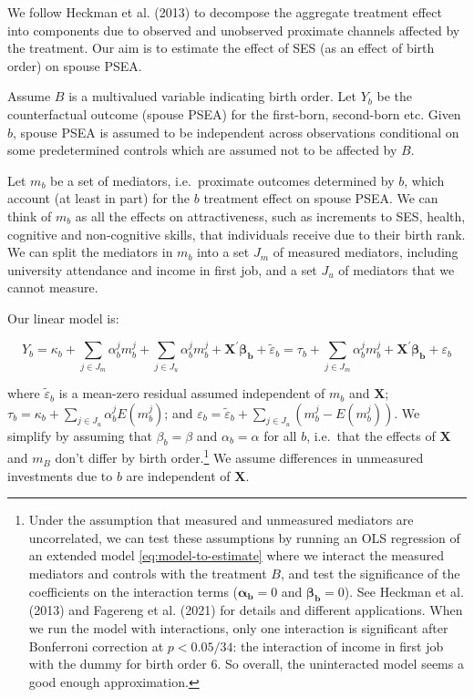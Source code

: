 \documentclass[
  12pt,
]{article}
\theoremstyle{definition}
\theoremstyle{definition}
\theoremstyle{definition}
\theoremstyle{definition}
\theoremstyle{remark}
\begin{document}
We follow Heckman et al. (2013) to decompose the aggregate treatment
effect into components due to observed and unobserved proximate channels
affected by the treatment. Our aim is to estimate the effect of SES (as
an effect of birth order) on spouse PSEA.

Assume \(B\) is a multivalued variable indicating birth order. Let \(Y_b\)
be the counterfactual outcome (spouse PSEA) for the first-born,
second-born etc. Given \(b\), spouse PSEA is assumed to be independent
across observations conditional on some predetermined controls which are
assumed not to be affected by \(B\).

Let \(m_{b}\) be a set of mediators, i.e.~proximate outcomes determined by
\(b\), which account (at least in part) for the \(b\) treatment effect on
spouse PSEA. We can think of \(m_{b}\) as all the effects on
attractiveness, such as increments to SES, health, cognitive and
non-cognitive skills, that individuals receive due to their birth rank.
We can split the mediators in \(m_b\) into a set \(J_m\) of measured
mediators, including university attendance and income in first job, and
a set \(J_u\) of mediators that we cannot measure.

Our linear model is:

\begin{equation}
\label{eq:linear-model}
Y_b = \kappa_b + \sum_{j \in J_m} \alpha_b^j m^j_b+\sum_{j \in J_u} \alpha_b^j m^j_b + \mathbf{X^\prime} \symbf{\beta_b} + \tilde{\varepsilon}_b = \tau_b + \sum_{j \in J_m} \alpha_b^j m^j_b + \mathbf{X^\prime} \symbf{\beta_b} + \varepsilon_b 
\end{equation}

where \(\tilde{\varepsilon}_b\) is a mean-zero residual assumed
independent of \(m_b\) and \(\mathbf{X}\);
\(\tau_b = \kappa_b + \sum_{j \in J_u} \alpha_b^j E(m^j_b)\); and
\(\varepsilon_b = \tilde{\varepsilon}_b + \sum_{j \in J_u} (m^j_b - E(m^j_b))\).
We simplify by assuming that \(\beta_b = \beta\) and \(\alpha_b = \alpha\)
for all \(b\), i.e.~that the effects of \(\mathbf{X}\) and \(m_B\) don't
differ by birth order.\footnote{Under the assumption that measured and unmeasured mediators are
  uncorrelated, we can test these assumptions by running an OLS
  regression of an extended model \eqref{eq:model-to-estimate} where we
  interact the measured mediators and controls with the treatment \(B\),
  and test the significance of the coefficients on the interaction
  terms (\(\symbf{\alpha_b}=0\) and \(\symbf{\beta_b}=0\)). See
  Heckman et al. (2013) and Fagereng et al. (2021) for details and
  different applications. When we run the model with interactions,
  only one interaction is significant after Bonferroni correction at
  \(p < 0.05/34\): the interaction of income in first job with the dummy
  for birth order 6. So overall, the uninteracted model seems a good
  enough approximation.} We assume differences in unmeasured
investments due to \(b\) are independent of \(\mathbf{X}\).
\end{document}
